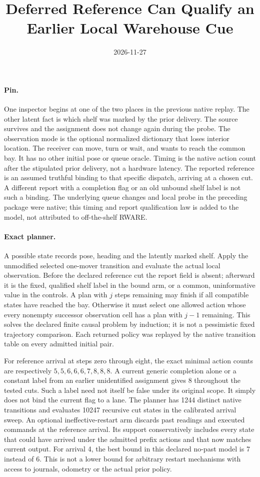 \documentclass{article}
\title{Deferred Reference Can Qualify an Earlier Local Warehouse Cue}
\date{2026-11-27}
\begin{document}
\maketitle

\paragraph{Pin.}
One inspector begins at one of the two places in the previous
native replay. The other latent fact is which shelf was marked
by the prior delivery. The source survives and the assignment
does not change again during the probe. The observation mode
is the optional normalized dictionary that loses interior
location. The receiver can move, turn or wait, and wants to
reach the common bay. It has no other initial pose or queue
oracle. Timing is the native action count after the stipulated
prior delivery, not a hardware latency. The reported reference
is an assumed truthful binding to that specific dispatch,
arriving at a chosen cut. A different report with a completion
flag or an old unbound shelf label is not such a binding.
The underlying queue changes and local probe in the preceding
package were native; this timing and report qualification law
is added to the model, not attributed to off-the-shelf RWARE.

\paragraph{Exact planner.}
A possible state records pose, heading and the latently marked
shelf. Apply the unmodified selected one-mover transition
and evaluate the actual local observation. Before the declared
reference cut the report field is absent; afterward it is
the fixed, qualified shelf label in the bound arm, or a
common, uninformative value in the controls. A plan with
\(j\) steps remaining may finish if all compatible states
have reached the bay. Otherwise it must select one allowed
action whose every nonempty successor observation cell has a
plan with \(j-1\) remaining. This solves the declared finite
causal problem by induction; it is not a pessimistic fixed
trajectory comparison. Each returned policy was replayed by
the native transition table on every admitted initial pair.

For reference arrival at steps zero through eight, the exact
minimal action counts are respectively \(5,5,6,6,6,7,8,8,8\).
A current generic completion alone or a constant label from
an earlier unidentified assignment gives 8 throughout the
tested cuts. Such a label need not itself be false under its
original scope. It simply does not bind the current flag to a
lane. The planner has 1244 distinct native transitions and
evaluates 10247 recursive cut states in the calibrated
arrival sweep. An optional ineffective-restart arm discards
past readings and executed commands at the reference arrival.
Its support conservatively includes every state that could
have arrived under the admitted prefix actions and that now
matches current output. For arrival 4, the best bound in this
declared no-past model is 7 instead of 6. This is not a lower
bound for arbitrary restart mechanisms with access to journals,
odometry or the actual prior policy.
\end{document}
